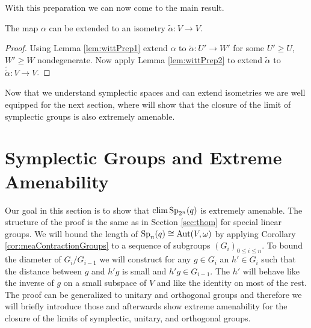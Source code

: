 With this preparation we can now come to the main result.
\begin{corollary}\label{lem:witt}
The map $\alpha$ can be extended to an isometry $\tilde{\alpha}\colon V\to V$.
\end{corollary}
\begin{proof}
Using Lemma \ref{lem:wittPrep1} extend $\alpha$ to $\tilde{\alpha}\colon U'\to W'$ for some $U'\geq U$, $W'\geq W$ nondegenerate. Now apply Lemma \ref{lem:wittPrep2} to extend $\tilde{\alpha}$ to $\tilde{\tilde{\alpha}}\colon V\to V$.
\end{proof}

Now that we understand symplectic spaces and can extend isometries we are well equipped for the next section, where will show that the closure of the limit of symplectic groups is also extremely amenable.


\section{Symplectic Groups and Extreme Amenability}\label{sec:mySec}


Our goal in this section is to show that $\operatorname{clim} \operatorname{Sp}_{2^n}(q)$ is extremely amenable. The structure of the proof is the same as in Section \ref{sec:thom} for special linear groups. We will bound the length of $\operatorname{Sp}_n(q)\cong\operatorname{Aut}(V,\omega)$ by applying Corollary \ref{cor:meaContractionGroups} to a sequence of subgroups $(G_i)_{0\leq i\leq n}$. To bound the diameter of $G_i/G_{i-1}$ we will construct for any $g\in G_i$ an $h'\in G_i$ such that the distance between $g$ and $h'g$ is small and $h'g\in G_{i-1}$. The $h'$ will behave like the inverse of $g$ on a small subspace of $V$ and like the identity on most of the rest. The proof can be generalized to unitary and orthogonal groups and therefore we will briefly introduce those and afterwards show extreme amenability for the closure of the limits of symplectic, unitary, and orthogonal groups.

